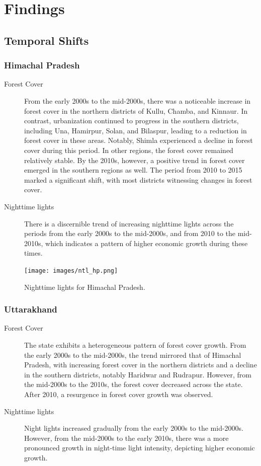 \documentclass[a4paper,12pt]{article}
\begin{document}
\section{Findings}

\subsection{Temporal Shifts}

\subsubsection*{Himachal Pradesh}

\begin{description}
    \item[Forest Cover] From the early 2000s to the mid-2000s, there was a noticeable increase in forest cover in the northern districts of Kullu, Chamba, and Kinnaur. In contrast, urbanization continued to progress in the southern districts, including Una, Hamirpur, Solan, and Bilaspur, leading to a reduction in forest cover in these areas. Notably, Shimla experienced a decline in forest cover during this period. In other regions, the forest cover remained relatively stable. By the 2010s, however, a positive trend in forest cover emerged in the southern regions as well. The period from 2010 to 2015 marked a significant shift, with most districts witnessing changes in forest cover.
    \item[Nighttime lights] There is a discernible trend of increasing nighttime lights across the periods from the early 2000s to the mid-2000s, and from 2010 to the mid-2010s, which indicates a pattern of higher economic growth during these times.

\end{description}

\begin{figure}[h]
    \centering
    \texttt{[image: images/ntl\_hp.png]}
    \caption{Nighttime lights for Himachal Pradesh.}
\end{figure}


\subsubsection*{Uttarakhand}

\begin{description}
    \item[Forest Cover] The state exhibits a heterogeneous pattern of forest cover growth. From the early 2000s to the mid-2000s, the trend mirrored that of Himachal Pradesh, with increasing forest cover in the northern districts and a decline in the southern districts, notably Haridwar and Rudrapur. However, from the mid-2000s to the 2010s, the forest cover decreased across the state. After 2010, a resurgence in forest cover growth was observed.
    \item[Nighttime lights] Night lights increased gradually from the early 2000s to the mid-2000s. However, from the mid-2000s to the early 2010s, there was a more pronounced growth in night-time light intensity, depicting higher economic growth.

\end{description}
\end{document}
